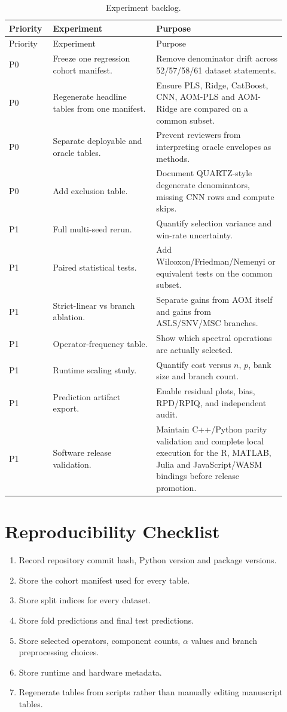 \documentclass[11pt,a4paper]{article}
\begin{document}
\begin{longtable}{L{0.13\linewidth}L{0.35\linewidth}L{0.44\linewidth}}
\caption{Experiment backlog.}\\
\toprule
Priority & Experiment & Purpose \\
\midrule
\endfirsthead
\toprule
Priority & Experiment & Purpose \\
\midrule
\endhead
P0 & Freeze one regression cohort manifest. & Remove denominator drift across 52/57/58/61 dataset statements.\\
P0 & Regenerate headline tables from one manifest. & Ensure PLS, Ridge, CatBoost, CNN, AOM-PLS and AOM-Ridge are compared on a common subset.\\
P0 & Separate deployable and oracle tables. & Prevent reviewers from interpreting oracle envelopes as methods.\\
P0 & Add exclusion table. & Document QUARTZ-style degenerate denominators, missing CNN rows and compute skips.\\
P1 & Full multi-seed rerun. & Quantify selection variance and win-rate uncertainty.\\
P1 & Paired statistical tests. & Add Wilcoxon/Friedman/Nemenyi or equivalent tests on the common subset.\\
P1 & Strict-linear vs branch ablation. & Separate gains from AOM itself and gains from ASLS/SNV/MSC branches.\\
P1 & Operator-frequency table. & Show which spectral operations are actually selected.\\
P1 & Runtime scaling study. & Quantify cost versus $n$, $p$, bank size and branch count.\\
P1 & Prediction artifact export. & Enable residual plots, bias, RPD/RPIQ, and independent audit.\\
P1 & Software release validation. & Maintain C++/Python parity validation and complete local execution for the R, MATLAB, Julia and JavaScript/WASM bindings before release promotion.\\
\bottomrule
\end{longtable}

\section{Reproducibility Checklist}

\begin{enumerate}
  \item Record repository commit hash, Python version and package versions.
  \item Store the cohort manifest used for every table.
  \item Store split indices for every dataset.
  \item Store fold predictions and final test predictions.
  \item Store selected operators, component counts, $\alpha$ values and branch
  preprocessing choices.
  \item Store runtime and hardware metadata.
  \item Regenerate tables from scripts rather than manually editing manuscript
  tables.
\end{enumerate}
\end{document}
